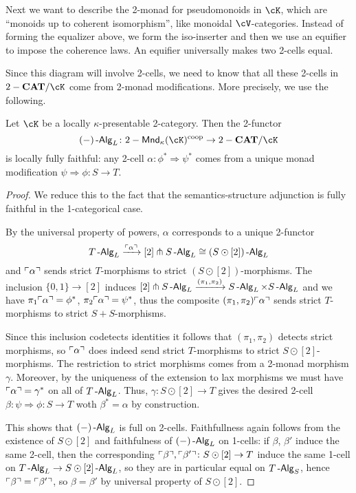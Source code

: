 \documentclass[a4paper,11pt,oneside,openany]{scrbook}
\begin{document}
Next we want to describe the 2-monad for pseudomonoids in $\cK$, which are
``monoids up to coherent isomorphism'', like monoidal $\cV$-categories. Instead
of forming the equalizer above, we form the iso-inserter and then we use an
equifier to impose the coherence laws. An equifier universally makes two 2-cells
equal.

Since this diagram will involve 2-cells, we need to know that all these 2-cells
in $2-\CAT/\cK$ come from 2-monad modifications. More precisely, we use the
following.

\begin{prop}
    Let $\cK$ be a locally $\kappa$-presentable 2-category. Then the 2-functor
    \[(-)\Alg_L\colon 2-\Mnd_\kappa(\cK)^{\text{coop}}\rightarrow 2-\CAT/\cK\]
    is locally fully faithful: any 2-cell $\alpha\colon\phi^*\Rightarrow\psi^*$
    comes from a unique monad modification $\psi\Rightarrow\phi\colon
    S\rightarrow T$.
\end{prop}
\begin{proof}
    We reduce this to the fact that the semantics-structure adjunction is fully
    faithful in the 1-categorical case.

    By the universal property of powers, $\alpha$ corresponds to a unique
    2-functor
    \[T\operatorname{-\mathsf{Alg}}_L\xrightarrow{\ulcorner \alpha \urcorner}[2]\pitchfork
    S\operatorname{-\mathsf{Alg}}_L\cong(S\odot[2])\operatorname{-\mathsf{Alg}}_L\]
    and $\ulcorner \alpha \urcorner$ sends strict $T$-morphisms to strict
    $(S\odot[2])$-morphisms. The inclusion $\{0,1\}\rightarrow[2]$ induces
    $[2]\pitchfork S\operatorname{-\mathsf{Alg}}_L\xrightarrow{(\pi_1,\pi_2)}S\operatorname{-\mathsf{Alg}}_L\times S\operatorname{-\mathsf{Alg}}_L$ and
    we have $\pi_1\ulcorner \alpha \urcorner=\phi^*$, $\pi_2\ulcorner \alpha \urcorner=\psi^*$, thus
    the composite $(\pi_1,\pi_2)\ulcorner \alpha \urcorner$ sends strict $T$-morphisms to
    strict $S+S$-morphisms.

    Since this inclusion codetects identities it follows that $(\pi_1,\pi_2)$
    detects strict morphisms, so $\ulcorner \alpha \urcorner$ does indeed send strict
    $T$-morphisms to strict $S\odot[2]$-morphisms. The restriction to strict
    morphisms comes from a 2-monad morphism $\gamma$. Moreover, by the
    uniqueness of the extension to lax morphisms we must have
    $\ulcorner \alpha \urcorner=\gamma^*$ on all of $T\operatorname{-\mathsf{Alg}}_L$. Thus, $\gamma\colon
    S\odot[2]\rightarrow T$ gives the desired 2-cell
    $\beta\colon\psi\Rightarrow\phi\colon S\rightarrow T$ woth $\beta^*=\alpha$
    by construction.

    This shows that $(-)\operatorname{-\mathsf{Alg}}_L$ is full on 2-cells. Faithfullness again follows
    from the existence of $S\odot[2]$ and faithfulness of $(-)\operatorname{-\mathsf{Alg}}_L$ on
    1-cells: if $\beta$, $\beta'$ induce the same 2-cell, then the corresponding
    $\ulcorner \beta \urcorner,\ulcorner \beta' \urcorner\colon S\odot[2]\rightarrow T$ induce the
    same 1-cell on $T\operatorname{-\mathsf{Alg}}_L\rightarrow S\odot[2]\operatorname{-\mathsf{Alg}}_L$, so they are in
    particular equal on $T\operatorname{-\mathsf{Alg}}_S$, hence $\ulcorner \beta \urcorner=\ulcorner \beta' \urcorner$, so
    $\beta=\beta'$ by universal property of $S\odot[2]$.
\end{proof}
\end{document}

